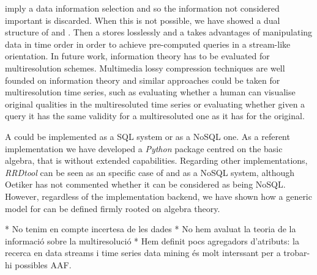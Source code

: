  imply a data information selection and so the information
not considered important is discarded. When this is not possible, we
have showed a dual structure of  and . Then a
 stores losslessly and a  takes advantages of
manipulating data in time order in order to achieve pre-computed
queries in a stream-like orientation.  In future work, information
theory has to be evaluated for multiresolution schemes. Multimedia
lossy compression techniques are well founded on information theory
and similar approaches could be taken for multiresolution time series,
such as evaluating whether a human can visualise original qualities in
the multiresoluted time series or evaluating
whether given a query it has the same validity for a multiresoluted
one as it has for the original.







A  could be implemented as a SQL  system or as
a NoSQL one. As a referent implementation we have developed a
\emph{Python} package centred on the basic algebra, that is without
extended  capabilities. Regarding other implementations,
\emph{RRDtool} can be seen as an specific case of  and as
a NoSQL system, although Oetiker \cite{rrdtool} has not commented
whether it can be considered as being NoSQL. However, regardless of
the implementation backend, we have shown how a generic model for
 can be defined firmly rooted on  algebra
theory. 


* No tenim en compte incertesa de les dades
* No hem avaluat la teoria de la informació sobre la multiresolució
* Hem definit pocs agregadors d'atributs: la recerca en data streams i  time series data mining és molt interssant per a trobar-hi possibles AAF.












